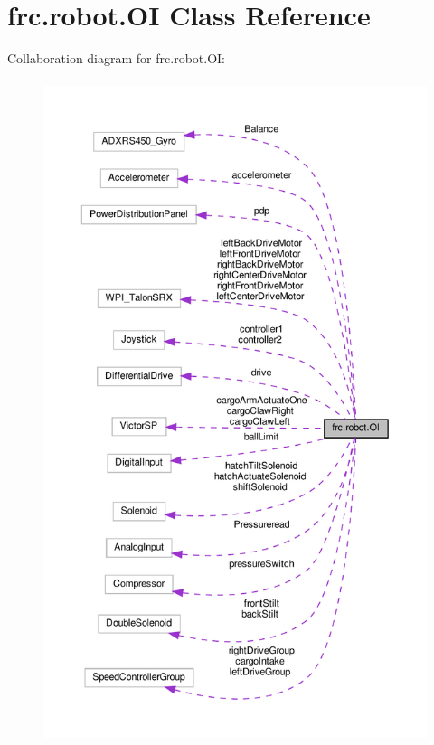 \hypertarget{classfrc_1_1robot_1_1_o_i}{}\section{frc.\+robot.\+OI Class Reference}
\label{classfrc_1_1robot_1_1_o_i}


Collaboration diagram for frc.\+robot.\+OI\+:\nopagebreak
\begin{figure}[H]
\begin{center}
\leavevmode
\includegraphics[height=550pt]{classfrc_1_1robot_1_1_o_i__coll__graph}
\end{center}
\end{figure}
